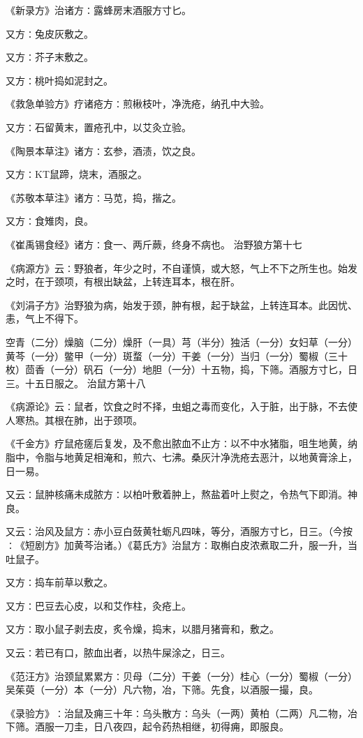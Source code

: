 \documentclass[a4paper,12pt,UTF8,twoside]{ctexbook}
\begin{document}
《新录方》治诸方∶露蜂房末酒服方寸匕。

又方∶兔皮灰敷之。

又方∶芥子末敷之。

又方∶桃叶捣如泥封之。

《救急单验方》疗诸疮方∶煎楸枝叶，净洗疮，纳孔中大验。

又方∶石留黄末，置疮孔中，以艾灸立验。

《陶景本草注》诸方∶玄参，酒渍，饮之良。

又方∶KT鼠蹄，烧末，酒服之。

《苏敬本草注》诸方∶马苋，捣，揩之。

又方∶食雉肉，良。

《崔禹锡食经》诸方∶食一、两斤蕨，终身不病也。
治野狼方第十七

《病源方》云∶野狼者，年少之时，不自谨慎，或大怒，气上不下之所生也。始发之时，在于颈项，有根出缺盆，上转连耳本，根在肝。

《刘涓子方》治野狼为病，始发于颈，肿有根，起于缺盆，上转连耳本。此因忧、恚，气上不得下。

空青（二分）燥脑（二分）燥肝（一具）芎（半分）独活（一分）女妇草（一分）黄芩（一分）鳖甲（一分）斑蝥（一分）干姜（一分）当归（一分）蜀椒（三十枚）茴香（一分）矾石（一分）地胆（一分）十五物，捣，下筛。酒服方寸匕，日三。十五日服之。
治鼠方第十八

《病源论》云∶鼠者，饮食之时不择，虫蛆之毒而变化，入于脏，出于脉，不去使人寒热。其根在肺，出于颈项。

《千金方》疗鼠疮瘥后复发，及不愈出脓血不止方∶以不中水猪脂，咀生地黄，纳脂中，令脂与地黄足相淹和，煎六、七沸。桑灰汁净洗疮去恶汁，以地黄膏涂上，日一易。

又云∶鼠肿核痛未成脓方∶以柏叶敷着肿上，熬盐着叶上熨之，令热气下即消。神良。

又云∶治风及鼠方∶赤小豆白蔹黄牡蛎凡四味，等分，酒服方寸匕，日三。（今按∶《短剧方》加黄芩治诸。）《葛氏方》治鼠方∶取槲白皮浓煮取二升，服一升，当吐鼠子。

又方∶捣车前草以敷之。

又方∶巴豆去心皮，以和艾作柱，灸疮上。

又方∶取小鼠子剥去皮，炙令燥，捣末，以腊月猪膏和，敷之。

又云∶若已有口，脓血出者，以热牛屎涂之，日三。

《范汪方》治颈鼠累累方∶贝母（二分）干姜（一分）桂心（一分）蜀椒（一分）吴茱萸（一分）本（一分）凡六物，冶，下筛。先食，以酒服一撮，良。

《录验方》∶治鼠及痈三十年∶乌头散方∶乌头（一两）黄柏（二两）凡二物，冶下筛。酒服一刀圭，日八夜四，起令药热相继，初得痈，即服良。
\end{document}
